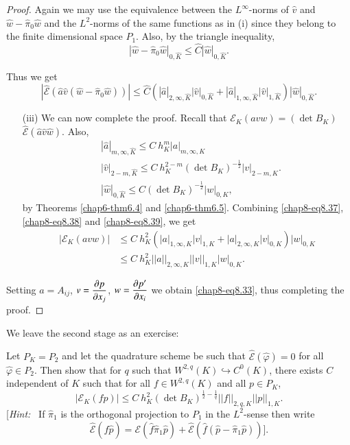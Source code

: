\begin{proof}
Again we may use the equivalence between the $L^{\infty}$-norms of
$\hat{v}$ and $\hat{w}-\hat{\pi}_{0}\hat{w}$ and the $L^{2}$-norms of
the same functions as in (i) since they belong to the finite
dimensional space $P_{1}$. Also, by the triangle inequality,
$$
|\hat{w}-\hat{\pi}_{0}\hat{w}|_{0,\hat{K}}\leq \hat{C}|\hat{w}|_{0,\hat{K}}.
$$

Thus we get 
\begin{equation*}
|\hat{\mathscr{E}}(\hat{a}\hat{v}(\hat{w}-\hat{\pi}_{0}\hat{w}))|\leq \hat{C}(|\hat{a}|_{2,\infty,\hat{K}}|\hat{v}|_{0,\hat{K}}+|\hat{a}|_{1,\infty,\hat{K}}|\hat{v}|_{1,\hat{K}})|\hat{w}|_{0,\hat{K}}.\tag{8.38}\label{chap8-eq8.38}
\end{equation*}\pageoriginale

\begin{itemize}
\item[(iii)] We can now complete the proof. Recall that
  $\mathscr{E}_{K}(avw)=(\det
  B_{K})$ $ \hat{\mathscr{E}}(\hat{a}\hat{v}\hat{w})$. Also,
\begin{equation*}
\begin{split}
& |\hat{a}|_{m,\infty,\hat{K}}\leq C\ h^{m}_{K}|a|_{m,\infty,K}\\
& |\hat{v}|_{2-m,\hat{K}}\leq C\ h^{2-m}_{K}(\det
  B_{K})^{-\frac{1}{2}}|v|_{2-m,K}.\\
&|\hat{w}|_{0,\hat{K}}\leq C(\det B_{K})^{-\frac{1}{2}}|w|_{0,K},
\end{split}\tag{8.39}\label{chap8-eq8.39}
\end{equation*}
by Theorems \ref{chap6-thm6.4} and \ref{chap6-thm6.5}. Combining
\eqref{chap8-eq8.37}, \eqref{chap8-eq8.38} and \eqref{chap8-eq8.39}, we get
\begin{align*}
|\mathscr{E}_{K}(avw)| &\leq
C\ h^{2}_{K}(|a|_{1,\infty,K}|v|_{1,K}+|a|_{2,\infty,K}|v|_{0,K})|w|_{0,K}\\
&\leq C\ h^{2}_{K}||a||_{2,\infty,K}||v||_{1,K}|w|_{0,K}. 
\end{align*}
\end{itemize}

Setting $a=A_{ij}$, $v=\dfrac{\partial p}{\partial x_{j}}$, $w=\dfrac{\partial p'}{\partial
  x_{i}}$ we obtain \eqref{chap8-eq8.33}, thus completing the proof.
\end{proof}

We leave the second stage as an exercise:

\begin{exercise}\label{chap8-exer8.5}
Let $P_{K}=P_{2}$ and let the quadrature scheme be such that
$\hat{\mathscr{E}}(\hat{\varphi})=0$ for all $\hat{\varphi}\in
P_{2}$. Then show that for $q$ such that $W^{2,q}(K)\hookrightarrow
C^{0}(K)$, there exists $C$ independent of $K$ such that for all $f\in
W^{2,q}(K)$ and all $p\in P_{K}$,
$$
|\mathscr{E}_{K}(fp)|\leq C\ h^{2}_{K}(\det
B_{K})^{\frac{1}{2}-\frac{1}{q}}||f||_{2,q,K}||p||_{1,K}. 
$$
[{\em Hint:}~ If $\hat{\pi}_{1}$ is the orthogonal projection to
  $P_{1}$ in the $L^{2}$-sense then write
$$
\hat{\mathscr{E}}(\hat{f}\hat{p})=\mathscr{E}(\hat{f}\hat{\pi}_{1}\hat{p})+\hat{\mathscr{E}}(\hat{f}(\hat{p}-\hat{\pi}_{1}\hat{p}))]. 
$$
\end{exercise}



